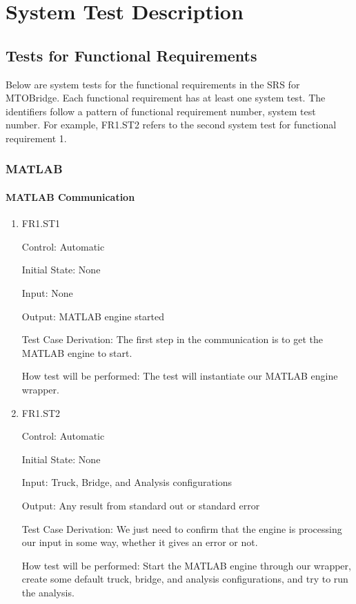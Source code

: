 \documentclass[12pt, titlepage]{article}
\begin{document}
\section{System Test Description}
	
\subsection{Tests for Functional Requirements}

Below are system tests for the functional requirements in the SRS for MTOBridge.
Each functional requirement has at least one system test. The identifiers follow a pattern of
functional requirement number, system test number. For example, FR1.ST2 refers to the second
system test for functional requirement 1.

\subsubsection{MATLAB}

\paragraph{MATLAB Communication}

\begin{enumerate}

  \item{FR1.ST1\\}

  Control: Automatic

  Initial State: None

  Input: None

  Output: MATLAB engine started

  Test Case Derivation: The first step in the communication is to get the MATLAB engine
  to start.

  How test will be performed: The test will instantiate our MATLAB engine wrapper.

  \item{FR1.ST2\\}

  Control: Automatic

  Initial State: None

  Input: Truck, Bridge, and Analysis configurations

  Output: Any result from standard out or standard error

  Test Case Derivation: We just need to confirm that the engine is processing our
  input in some way, whether it gives an error or not.

  How test will be performed: Start the MATLAB engine through our wrapper, create
  some default truck, bridge, and analysis configurations, and try to run the analysis.

\end{enumerate}
\end{document}
